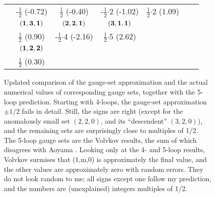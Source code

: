\begin{figure}
{\begin{tabular}{r@{~~~~}ccccc@{~~~~}l}
                 & -$\frac{1}{2}$ (-0.72)   & $\frac{1}{2}$ {\color{red}(-0.40)}
                                        & -$\frac{1}{2}${\color{red}$\cdot$2} (-1.02)
                                             &  $\frac{1}{2}${\color{red}$\cdot$2} (1.09)
 \\%
\raisebox{1.5ex}{10}
 & $\bf (1,3,1)$  & $\bf (2,2,1)$ & $\bf (3,1,1)$ &&& \raisebox{1.5ex}{$\frac{3}{2} {\color{red} \cdot 4}(6.78)$}\\
 &  $\frac{1}{2}$ (0.90)    & -$\frac{1}{2}${\color{red}$\cdot$4} (-2.16)
                                  & $\frac{1}{2}${\color{red}$\cdot$5} (2.62)
  \\[1ex]
 & $\bf (1,2,2)$ \\
 & $\frac{1}{2}$ (0.30)
  \\[1ex]
\bottomrule
\end{tabular}
} %
\caption{\label{tabGaugeSets}
Updated  comparison of the gauge-set approximation
 and the actual numerical values of corresponding gauge
sets, together with the 5-loop prediction. Starting with 4-loops, the
gauge-set approximation $\pm1/2$ fails in detail. Still,
the signs are right (except for the anomalously small set $(2,2,0)$, and its
``descendent'' $(3,2,0)$),
and the remaining sets are surprisingly close to multiples of 1/2.
The 5-loop gauge sets are the Volvkov results,
the sum of which disagrees with Aoyama \etal{}.
Looking only at the 4- and 5-loop results, Volvkov surmises that (1,m,0)
is approximately the final value, and the other values are approximately
zero with random errors.
They do not look random to me; all signs except one follow my prediction, and the
numbers are (unexplained) integers multiples of 1/2.
}
\end{figure}
